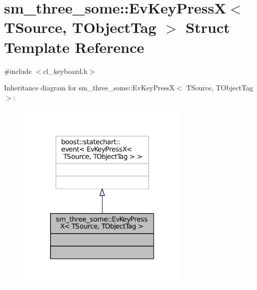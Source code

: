 \hypertarget{structsm__three__some_1_1EvKeyPressX}{}\section{sm\+\_\+three\+\_\+some\+:\+:Ev\+Key\+PressX$<$ T\+Source, T\+Object\+Tag $>$ Struct Template Reference}
\label{structsm__three__some_1_1EvKeyPressX}


{\ttfamily \#include $<$cl\+\_\+keyboard.\+h$>$}



Inheritance diagram for sm\+\_\+three\+\_\+some\+:\+:Ev\+Key\+PressX$<$ T\+Source, T\+Object\+Tag $>$\+:
\nopagebreak
\begin{figure}[H]
\begin{center}
\leavevmode
\includegraphics[width=235pt]{structsm__three__some_1_1EvKeyPressX__inherit__graph}
\end{center}
\end{figure}


